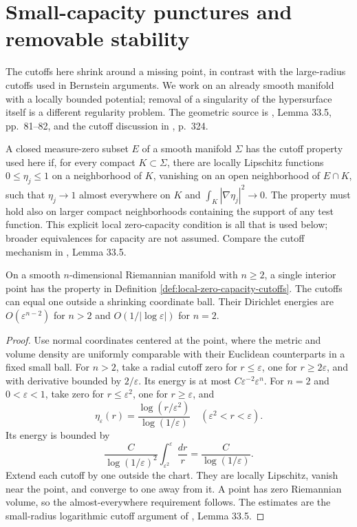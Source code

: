 \chapter{Small-capacity punctures and removable stability}\label{sec:puncture-stability}
The cutoffs here shrink around a missing point, in contrast with the large-radius cutoffs used in Bernstein arguments. We work on an already smooth manifold with a locally bounded potential; removal of a singularity of the hypersurface itself is a different regularity problem. The geometric source is \cite{ChMin}, Lemma 33.5, pp.~81--82, and the cutoff discussion in \cite{Sharp17}, p.~324.

\begin{definition}\label{def:local-zero-capacity-cutoffs}
A closed measure-zero subset $E$ of a smooth manifold $\Sigma$ has the cutoff property used here if, for every compact $K\subset\Sigma$, there are locally Lipschitz functions $0\leq\eta_j\leq1$ on a neighborhood of $K$, vanishing on an open neighborhood of $E\cap K$, such that $\eta_j\to1$ almost everywhere on $K$ and $\int_K|\nabla\eta_j|^2\to0$. The property must hold also on larger compact neighborhoods containing the support of any test function. This explicit local zero-capacity condition is all that is used below; broader equivalences for capacity are not assumed. Compare the cutoff mechanism in \cite{ChMin}, Lemma 33.5.
\end{definition}

\begin{lemma}\label{lem:point-capacity-cutoffs}
On a smooth $n$-dimensional Riemannian manifold with $n\geq2$, a single interior point has the property in Definition \ref{def:local-zero-capacity-cutoffs}. The cutoffs can equal one outside a shrinking coordinate ball. Their Dirichlet energies are $O(\varepsilon^{n-2})$ for $n>2$ and $O(1/|\log\varepsilon|)$ for $n=2$.
\end{lemma}
\begin{proof}
Use normal coordinates centered at the point, where the metric and volume density are uniformly comparable with their Euclidean counterparts in a fixed small ball. For $n>2$, take a radial cutoff zero for $r\leq\varepsilon$, one for $r\geq2\varepsilon$, and with derivative bounded by $2/\varepsilon$. Its energy is at most $C\varepsilon^{-2}\varepsilon^n$.
For $n=2$ and $0<\varepsilon<1$, take zero for $r\leq\varepsilon^2$, one for $r\geq\varepsilon$, and
\[
 \eta_\varepsilon(r)=\frac{\log(r/\varepsilon^2)}{\log(1/\varepsilon)}
 \quad(\varepsilon^2<r<\varepsilon).
\]
Its energy is bounded by
\[
 \frac{C}{\log(1/\varepsilon)^2}\int_{\varepsilon^2}^{\varepsilon}\frac{dr}{r}
 =\frac{C}{\log(1/\varepsilon)}.
\]
Extend each cutoff by one outside the chart. They are locally Lipschitz, vanish near the point, and converge to one away from it. A point has zero Riemannian volume, so the almost-everywhere requirement follows. The estimates are the small-radius logarithmic cutoff argument of \cite{ChMin}, Lemma 33.5.
\end{proof}

